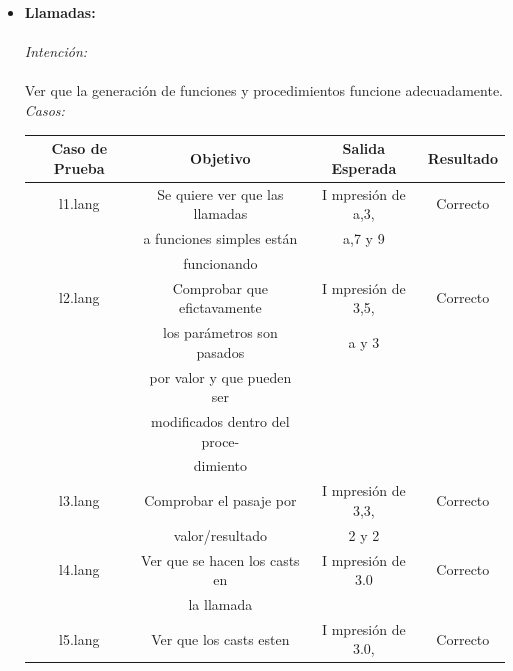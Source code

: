 \documentclass[11pt, spanish]{report}
\begin{document}
\begin{itemize}
\item \textbf{Llamadas:}\\ \\
  \emph{Intenci\'on:}\\ \\
  Ver que la generaci\'on de funciones y procedimientos funcione adecuadamente.\\

  \emph{Casos:}\\ 
  \begin{table}[!hbp]
    \begin{tabular}{c c c c}
      \hline            
      \hline            
      Caso de Prueba & Objetivo                       & Salida Esperada      & Resultado \\ [0.5ex]
      \hline                          
      l1.lang        & Se quiere ver que las llamadas & I mpresi\'on de a,3, & Correcto  \\ [1ex] 
                     & a funciones simples est\'an    & a,7 y 9              &           \\ [1ex] 
                     & funcionando                    &                      &           \\ [1ex] 
      l2.lang        & Comprobar que efictavamente    & I mpresi\'on de 3,5, & Correcto  \\ [1ex] 
                     & los par\'ametros son pasados   & a y 3                &           \\ [1ex] 
                     & por valor y que pueden ser     &                      &           \\ [1ex] 
                     & modificados dentro del proce-  &                      &           \\ [1ex] 
                     & dimiento                       &                      &           \\ [1ex] 
      l3.lang        & Comprobar el pasaje por        & I mpresi\'on de 3,3, & Correcto  \\ [1ex] 
                     & valor/resultado                & 2 y 2                &           \\ [1ex] 
      l4.lang        & Ver que se hacen los casts en  & I mpresi\'on de 3.0  & Correcto  \\ [1ex] 
                     & la llamada                     &                      &           \\ [1ex] 
      l5.lang        & Ver que los casts esten        & I mpresi\'on de 3.0, & Correcto  \\ [1ex] 

\end{tabular}
\end{table}
\end{itemize}
\end{document}
